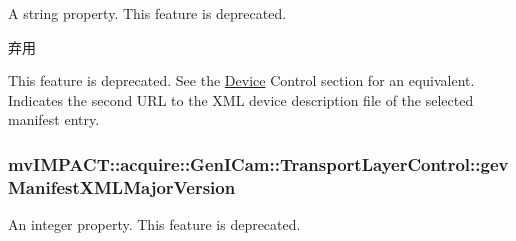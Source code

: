 A string property. This feature is deprecated. 

\begin{DoxyRefDesc}{弃用}
\item[\hyperlink{deprecated__deprecated000093}{弃用}]This feature is deprecated. See the \hyperlink{classmv_i_m_p_a_c_t_1_1acquire_1_1_device}{Device} Control section for an equivalent. Indicates the second U\+R\+L to the X\+M\+L device description file of the selected manifest entry. \end{DoxyRefDesc}
\hypertarget{classmv_i_m_p_a_c_t_1_1acquire_1_1_gen_i_cam_1_1_transport_layer_control_aa076814262e6646b5a7178cd36454f50}{
\subsubsection[{gev\+Manifest\+X\+M\+L\+Major\+Version}]{ mv\+I\+M\+P\+A\+C\+T\+::acquire\+::\+Gen\+I\+Cam\+::\+Transport\+Layer\+Control\+::gev\+Manifest\+X\+M\+L\+Major\+Version}}\label{classmv_i_m_p_a_c_t_1_1acquire_1_1_gen_i_cam_1_1_transport_layer_control_aa076814262e6646b5a7178cd36454f50}


An integer property. This feature is deprecated. 

